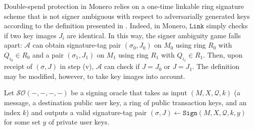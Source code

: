 \documentclass{mrl}
\theoremstyle{definition}
\begin{document}
Double-spend protection in Monero relies on a one-time linkable ring signature scheme that is not signer ambiguous with respect to adversarially generated keys according to the definition presented in \cite{bender2006ring}. Indeed, in Monero, $\texttt{Link}$ simply checks if two key images $J_i$ are identical. In this way, the signer ambiguity game falls apart: $\mathcal{A}$ can obtain signature-tag pair $(\sigma_0, J_0)$ on $M_0$ using ring $R_0$ with $Q_{i_0} \in R_0$ and a pair $(\sigma_1, J_1)$ on $M_1$ using ring $R_1$ with $Q_{i_1} \in R_1$. Then, upon receipt of $(\sigma,J)$ in step (v), $\mathcal{A}$ can check if $J=J_0$ or $J=J_1$. The definition may be modified, however, to take key images into account.


Let $\mathcal{SO}(-,-,-,-)$ be a signing oracle that takes as input $(M,X,\mathcal{Q},k)$ (a message, a destination public user key, a ring of public transaction keys, and an index $k$) and outputs a valid signature-tag pair $(\sigma, J) \leftarrow \texttt{Sign}(M,X,\mathcal{Q},k,y)$ for some set $y$ of private user keys.
\end{document}
